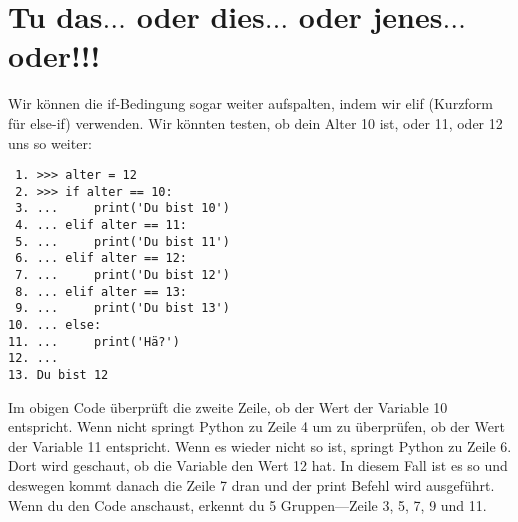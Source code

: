 \section{Tu das$\ldots$ oder dies$\ldots$ oder jenes$\ldots$ oder!!!}

Wir können die if-Bedingung sogar weiter aufspalten, indem wir elif (Kurzform für else-if) verwenden. Wir könnten testen, ob dein Alter 10 ist, oder 11, oder 12 uns so weiter:

\begin{listing}
\begin{verbatim}
 1. >>> alter = 12
 2. >>> if alter == 10:
 3. ...     print('Du bist 10')
 4. ... elif alter == 11:
 5. ...     print('Du bist 11')
 6. ... elif alter == 12:
 7. ...     print('Du bist 12')
 8. ... elif alter == 13:
 9. ...     print('Du bist 13')
10. ... else:
11. ...     print('Hä?')
12. ...
13. Du bist 12
\end{verbatim}
\end{listing}

Im obigen Code überprüft die zweite Zeile, ob der Wert der Variable 10 entspricht. Wenn nicht springt Python zu Zeile 4 um zu überprüfen, ob der Wert der  Variable 11 entspricht. Wenn es wieder nicht so ist, springt Python zu Zeile 6. Dort wird geschaut, ob die Variable den Wert 12 hat. In diesem Fall ist es so und deswegen kommt danach die Zeile 7 dran und der print Befehl wird ausgeführt. Wenn du den Code anschaust, erkennt du 5 Gruppen---Zeile 3, 5, 7, 9 und 11.

